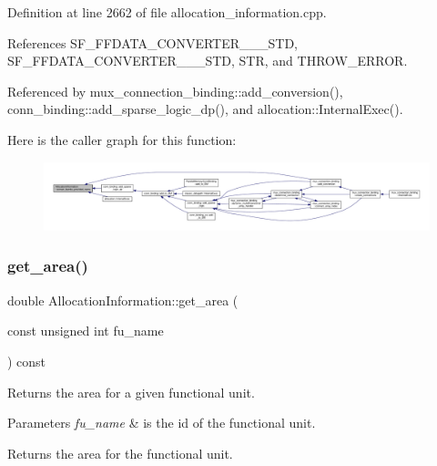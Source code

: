 Definition at line 2662 of file allocation\+\_\+information.\+cpp.



References S\+F\+\_\+\+F\+F\+D\+A\+T\+A\+\_\+\+C\+O\+N\+V\+E\+R\+T\+E\+R\+\_\+\_\+\_\+\+S\+TD, S\+F\+\_\+\+F\+F\+D\+A\+T\+A\+\_\+\+C\+O\+N\+V\+E\+R\+T\+E\+R\+\_\+\_\+\_\+\+S\+TD, S\+TR, and T\+H\+R\+O\+W\+\_\+\+E\+R\+R\+OR.



Referenced by mux\+\_\+connection\+\_\+binding\+::add\+\_\+conversion(), conn\+\_\+binding\+::add\+\_\+sparse\+\_\+logic\+\_\+dp(), and allocation\+::\+Internal\+Exec().

Here is the caller graph for this function\+:
\nopagebreak
\begin{figure}[H]
\begin{center}
\leavevmode
\includegraphics[width=350pt]{d7/d79/classAllocationInformation_a8b75a35aaa38a9c7c46a78ac477c1fea_icgraph}
\end{center}
\end{figure}
\mbox{\label{classAllocationInformation_a200074a0f73ed6e067be0d668517b7a5}} 
\subsubsection{\texorpdfstring{get\+\_\+area()}{get\_area()}}
{\footnotesize\ttfamily double Allocation\+Information\+::get\+\_\+area (\begin{DoxyParamCaption}\item[{const unsigned int}]{fu\+\_\+name }\end{DoxyParamCaption}) const}



Returns the area for a given functional unit. 


\begin{DoxyParams}{Parameters}
{\em fu\+\_\+name} & is the id of the functional unit. \\
\hline
\end{DoxyParams}
\begin{DoxyReturn}{Returns}
the area for the functional unit. 
\end{DoxyReturn}


